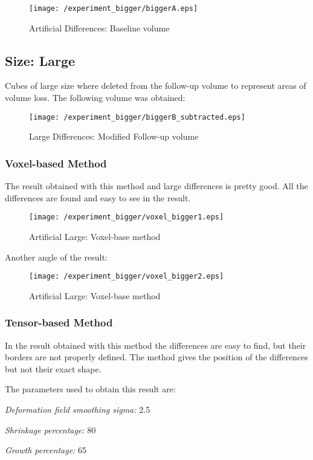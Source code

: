 \begin{figure}[H]
  \centering
  \texttt{[image: /experiment\_bigger/biggerA.eps]}
  \caption{Artificial Differences: Baseline volume}
  \label{artificial_base}
\end{figure}

\subsection{Size: Large}
Cubes of large size where deleted from the follow-up volume to
represent areas of volume loss. The following volume was obtained:

\begin{figure}[H]
  \centering
  \texttt{[image: /experiment\_bigger/biggerB\_subtracted.eps]}
  \caption{Large Differences: Modified Follow-up volume}
  \label{largeB}
\end{figure}

\subsubsection{Voxel-based Method}
The result obtained with this method and large differences is pretty
good. All the differences are found and easy to see in the result.

\begin{figure}[H]
  \centering
  \texttt{[image: /experiment\_bigger/voxel\_bigger1.eps]}
  \caption{Artificial Large: Voxel-base method}
  \label{voxel_large1}
\end{figure}

Another angle of the result:

\begin{figure}[H]
  \centering
  \texttt{[image: /experiment\_bigger/voxel\_bigger2.eps]}
  \caption{Artificial Large: Voxel-base method}
  \label{voxel_large2}
\end{figure}

\subsubsection{Tensor-based Method}
In the result obtained with this method the differences are easy to
find, but their borders are not properly defined. The method gives the
position of the differences but not their exact shape.

The parameters used to obtain this result are:
\begin{description}
\item \textit{Deformation field smoothing sigma:} 2.5
\item \textit{Shrinkage percentage:} 80
\item \textit{Growth percentage:} 65
\end{description}

